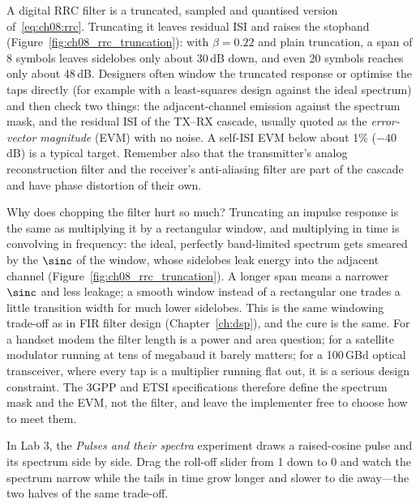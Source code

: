 \begin{pitfall}
A digital RRC filter is a truncated, sampled and quantised version of~\eqref{eq:ch08:rrc}.
Truncating it leaves residual ISI and raises the stopband (Figure~\ref{fig:ch08_rrc_truncation}):
with $\beta=0.22$ and plain truncation, a span of 8 symbols leaves sidelobes only about 30\,dB
down, and even 20 symbols reaches only about 48\,dB. Designers often window the truncated
response or optimise the taps directly (for example with a least-squares design against the
ideal spectrum) and then check two things: the adjacent-channel emission against the spectrum
mask, and the residual ISI of the TX--RX cascade, usually quoted as the \emph{error-vector
magnitude} (EVM) with no noise. A self-ISI EVM below about 1\% ($-40$\,dB) is a typical target.
Remember also that the transmitter's analog reconstruction filter and the receiver's
anti-aliasing filter are part of the cascade and have phase distortion of their own.
\end{pitfall}


Why does chopping the filter hurt so much? Truncating an impulse response is the same as
multiplying it by a rectangular window, and multiplying in time is convolving in frequency:
the ideal, perfectly band-limited spectrum gets smeared by the $\sinc$ of the window, whose
sidelobes leak energy into the adjacent channel (Figure~\ref{fig:ch08_rrc_truncation}). A
longer span means a narrower $\sinc$ and less leakage; a smooth window instead of a
rectangular one trades a little transition width for much lower sidelobes. This is the same
windowing trade-off as in FIR filter design (Chapter~\ref{ch:dsp}), and the cure is the same.
For a handset modem the filter length is a power and area question; for a satellite modulator
running at tens of megabaud it barely matters; for a 100\,GBd optical transceiver, where every
tap is a multiplier running flat out, it is a serious design constraint. The 3GPP and ETSI
specifications therefore define the spectrum mask and the EVM, not the filter, and leave the
implementer free to choose how to meet them.

\begin{tryit}
In Lab 3, the \emph{Pulses and their spectra} experiment draws a raised-cosine pulse and its spectrum
side by side. Drag the roll-off slider from 1 down to 0 and watch the spectrum narrow while
the tails in time grow longer and slower to die away---the two halves of the same trade-off.
\end{tryit}

